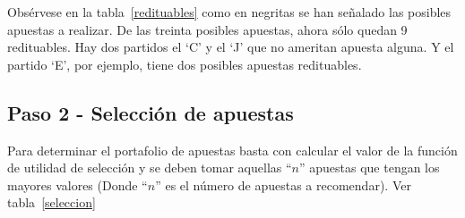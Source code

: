 \begin{table}[ht]
\centering
{}
\caption{Escogiendo apuestas que vale la pena realizar}
\label{redituables}
\end{table}

Obsérvese en la tabla~\ref{redituables} como en negritas se han señalado las posibles apuestas a realizar. De las treinta posibles apuestas, ahora sólo quedan 9 redituables. Hay dos partidos el `C' y el `J' que no ameritan apuesta alguna. Y el partido `E', por ejemplo, tiene dos posibles apuestas redituables.

\subsection{Paso 2 - Selección de apuestas}
\label{sec:paso-2}


Para determinar el portafolio de apuestas basta con calcular el valor de la función de utilidad de selección y se deben tomar aquellas ``$n$'' apuestas que tengan los mayores valores (Donde ``$n$'' es el número de apuestas a recomendar).
Ver tabla~\ref{seleccion}

